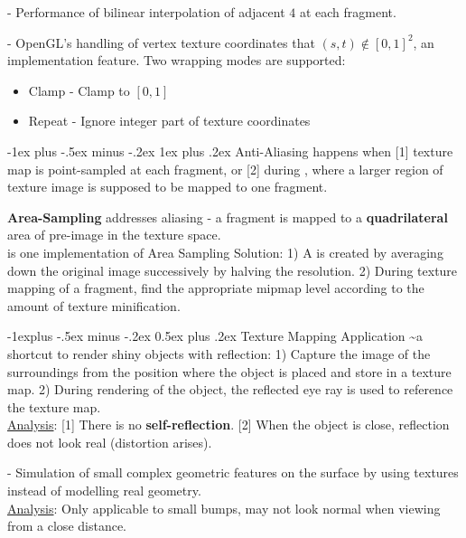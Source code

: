 \documentclass[10pt,landscape,letterpaper]{article}
\makeatletter
\renewcommand{\subsection}{\@startsection{subsection}{2}{0mm}%
                                {-1explus -.5ex minus -.2ex}%
                                {0.5ex plus .2ex}%
                                {\sffamily\normalsize\itshape}}
\renewcommand{\subsubsection}{\@startsection{subsubsection}{3}{0mm}%
                                {-1ex plus -.5ex minus -.2ex}%
                                {1ex plus .2ex}%
                                {\normalfont\small\itshape}}
\makeatother
\begin{document}
\begin{multicols}{3}
 - Performance of bilinear interpolation of adjacent $4$  at each fragment.

\medskip

 - OpenGL's handling of vertex texture coordinates that $(s, t) \not\in [0, 1]^2$, an implementation feature. Two wrapping modes are supported:
\begin{itemize}
    \item Clamp - Clamp to $[0, 1]$
    \item Repeat - Ignore integer part of texture coordinates
\end{itemize}


\subsubsection{Anti-Aliasing}
 happens when [1] texture map is point-sampled at each fragment, or [2] during , where a larger region of texture image is supposed to be mapped to one fragment. 

\medskip

\textbf{Area-Sampling} addresses aliasing - a fragment is mapped to a \textbf{quadrilateral} area of pre-image in the texture space.
\\
 is one implementation of Area Sampling Solution: 1) A  is created by averaging down the original image successively by halving the resolution. 2) During texture mapping of a fragment, find the appropriate mipmap level according to the amount of texture minification.


\subsection{Texture Mapping Application}
 \textasciitilde a shortcut to render shiny objects with reflection: 1) Capture the image of the surroundings from the position where the object is placed and store in a texture map. 2) During rendering of the object, the reflected eye ray is used to reference the texture map.
\\
\underline{Analysis}: [1] There is no \textbf{self-reflection}. [2] When the object is close, reflection does not look real (distortion arises). 

\medskip

 - Simulation of small complex geometric features on the surface by using textures instead of modelling real geometry.
\\
\underline{Analysis}: Only applicable to small bumps, may not look normal  when viewing from a close distance.


\end{multicols}
\end{document}
